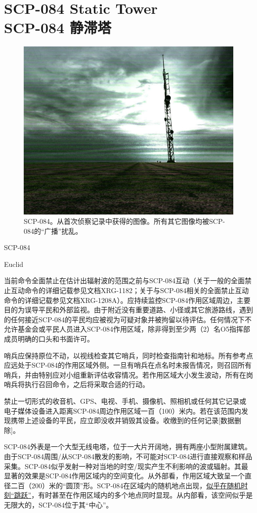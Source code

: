 \chapter[SCP-084 静滞塔]{
    SCP-084 Static Tower\\
    SCP-084 静滞塔
}

\label{chap:SCP-084}

\begin{figure}[H]
    \centering
    \includegraphics[width=0.5\linewidth]{images/SCP.084.jpg}
    \caption*{SCP-084。从首次侦察记录中获得的图像。所有其它图像均被SCP-084的“广播”扰乱。}
\end{figure}

SCP-084

Euclid

当前命令全面禁止在估计出辐射波的范围之前与SCP-084互动（关于一般的全面禁止互动命令的详细记载参见文档XRG-1182；关于与SCP-084相关的全面禁止互动命令的详细记载参见文档XRG-1208A）。应持续监控SCP-084作用区域周边，主要目的为误导平民和外部监视。由于附近没有重要道路、小径或其它旅游路线，遇到的任何接近SCP-084的平民均应被视为可疑对象并被拘留以待评估。任何情况下不允许基金会或平民人员进入SCP-084作用区域，除非得到至少两（2）名O5指挥部成员明确的口头和书面许可。

哨兵应保持原位不动，以视线检查其它哨兵，同时检查指南针和地标。所有参考点应远处于SCP-084的作用区域外侧。一旦有哨兵在点名时未报告情况，则召回所有哨兵，并由特别应对小组重新评估收容情况。若作用区域大小发生波动，所有在岗哨兵将执行召回命令，之后将采取合适的行动。

禁止一切形式的收音机、GPS、电视、手机、摄像机、照相机或任何其它记录或电子媒体设备进入距离SCP-084周边作用区域一百（100）米内。若在该范围内发现携带上述设备的平民，应立即没收并销毁其设备。收缴到的任何记录{[}数据删除]。

SCP-084外表是一个大型无线电塔，位于一大片开阔地，拥有两座小型附属建筑。由于SCP-084周围\slash 从SCP-084散发的影响，不可能对SCP-084进行直接观察和样品采集。SCP-084似乎发射一种对当地的时空\slash 现实产生不利影响的波或辐射。其最显著的效果是SCP-084作用区域内的空间变化。从外部看，作用区域大致呈一个直径二百（200）米的“圆顶”形。SCP-084在区域内的随机地点出现，\hyperref[chap:SCP-2675]{似乎在随机时刻“跳跃”}，有时甚至在作用区域内的多个地点同时显现。从内部看，该空间似乎是无限大的，SCP-084位于其“中心”。

